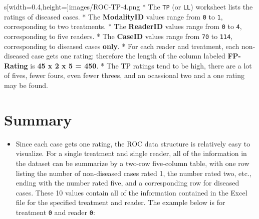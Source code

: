 \documentclass[]{book}
\providecommand{\tightlist}{%
  \setlength{\itemsep}{0pt}\setlength{\parskip}{0pt}}
\begin{document}
s[width=0.4\textwidth,height=\textheight]{images/ROC-TP-4.png}
* The \texttt{TP} (or \texttt{LL}) worksheet lists the ratings of diseased cases.
* The \textbf{ModalityID} values range from \texttt{0} to \texttt{1}, corresponding to two treatments.
* The \textbf{ReaderID} values range from \texttt{0} to \texttt{4}, corresponding to five readers.
* The \textbf{CaseID} values range from \texttt{70} to \texttt{114}, corresponding to diseased cases \textbf{only}.
* For each reader and treatment, each non-diseased case gets one rating; therefore the length of the column labeled \textbf{FP-Rating} is \textbf{45 x 2 x 5 = 450}.
* The TP ratings tend to be high, there are a lot of fives, fewer fours, even fewer threes, and an ocassional two and a one rating may be found.

\hypertarget{summary}{%
\section{Summary}\label{summary}}

\begin{itemize}
\tightlist
\item
  Since each case gets one rating, the ROC data structure is relatively easy to visualize. For a single treatment and single reader, all of the information in the dataset can be summarize by a two-row five-column table, with one row listing the number of non-diseased cases rated 1, the number rated two, etc., ending with the number rated five, and a corresponding row for diseased cases. These 10 values contain all of the information contained in the Excel file for the specified treatment and reader. The example below is for treatment \texttt{0} and reader \texttt{0}:
\end{itemize}
\end{document}
